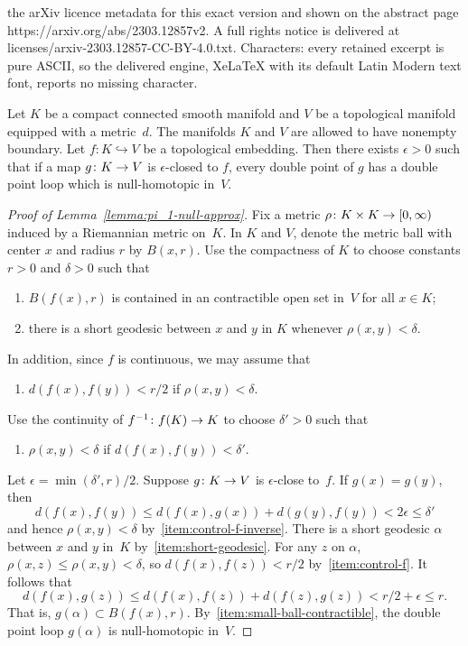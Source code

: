 \documentclass[10pt,a4paper]{amsart}
\def\to{\mathchoice{\longrightarrow}{\rightarrow}{\rightarrow}{\rightarrow}}
\begin{document}
the arXiv licence metadata for this exact version and shown on the abstract page https://arxiv.org/abs/2303.12857v2. A full rights notice is delivered at licenses/arxiv-2303.12857-CC-BY-4.0.txt. Characters: every retained excerpt is pure ASCII, so the delivered engine, XeLaTeX with its default Latin Modern text font, reports no missing character.
\begin{lemma}
  \label{lemma:pi_1-null-approx}
  Let $K$ be a compact connected smooth manifold and $V$ be a topological manifold equipped with a metric~$d$.
  The manifolds $K$ and $V$ are allowed to have nonempty boundary.
  Let $f\colon K\hookrightarrow V$ be a topological embedding.
  Then there exists $\epsilon>0$ such that if a map $g\colon K\to V$ is $\epsilon$-closed to $f$, every double point of $g$ has a double point loop which is null-homotopic in~$V$.
\end{lemma}

\begin{proof}[Proof of Lemma~\ref{lemma:pi_1-null-approx}]
  Fix a metric $\rho\colon K\times K \to [0,\infty)$ induced by a Riemannian metric on~$K$.
  In $K$ and $V$, denote the metric ball with center $x$ and radius $r$ by $B(x,r)$.
  Use the compactness of $K$ to choose constants $r>0$ and $\delta>0$ such that 
  \begin{enumerate}[label=(\roman*)]
    \item\label{item:small-ball-contractible} $B(f(x),r)$ is contained in an contractible open set in~$V$ for all $x\in K$;
    \item\label{item:short-geodesic} there is a short geodesic between $x$ and $y$ in $K$ whenever $\rho(x,y)<\delta$.
  \end{enumerate}
  In addition, since $f$ is continuous, we may assume that
  \begin{enumerate}[resume*]
    \item\label{item:control-f} $d(f(x),f(y)) < r/2$ if $\rho(x,y)<\delta$.
  \end{enumerate}
  Use the continuity of $f^{-1}\colon f(K) \to K$ to choose $\delta' >0$ such that 
  \begin{enumerate}[resume*]
    \item\label{item:control-f-inverse} $\rho(x,y)<\delta$ if $d(f(x),f(y))<\delta'$.
  \end{enumerate}

  Let $\epsilon=\min(\delta', r)/2$.
  Suppose $g \colon K\to V$ is $\epsilon$-close to~$f$.
  If $g(x)=g(y)$, then
  \[
    d(f(x), f(y))\leq d(f(x),g(x))+d(g(y), f(y))<2\epsilon \le \delta'
  \]
  and hence $\rho(x,y)<\delta$ by~\ref{item:control-f-inverse}.
  There is a short geodesic $\alpha$ between $x$ and $y$ in~$K$ by~\ref{item:short-geodesic}.
  For any $z$ on $\alpha$, $\rho(x,z)\leq \rho(x,y)<\delta$, so $d(f(x),f(z)) < r/2$ by~\ref{item:control-f}.
  It follows that
  \[
    d(f(x),g(z)) \leq d(f(x),f(z))+d(f(z),g(z) )< r/2 +\epsilon \leq r.
  \]
  That is, $g(\alpha)\subset B(f(x), r)$.
  By~\ref{item:small-ball-contractible}, the double point loop $g(\alpha)$ is null-homotopic in~$V$.
\end{proof}
\end{document}
